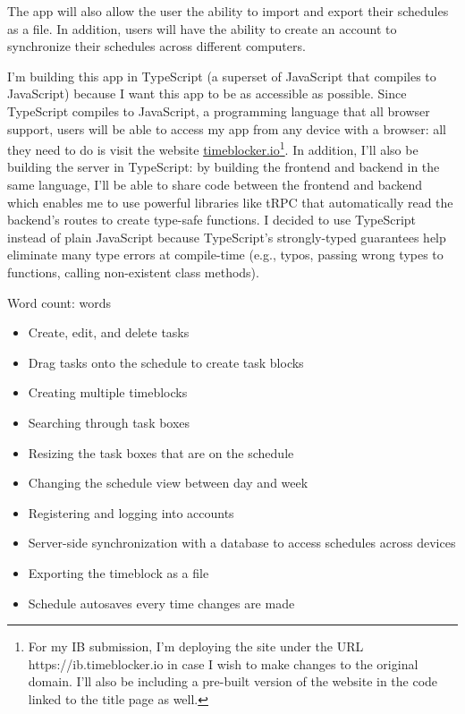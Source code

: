\documentclass[12pt, notitlepage]{article}
\newcommand\wordcount[2]{%
\py{word_count(#1, #2)}
\noindent Word count: words
}
\begin{document}
The app will also allow the user the ability to import and export their schedules as a file.
In addition, users will have the ability to create an account to synchronize their schedules across different computers.

I'm building this app in TypeScript (a superset of JavaScript that compiles to JavaScript) because I want this app to be as accessible as possible.
Since TypeScript compiles to JavaScript, a programming language that all browser support, users will be able to access my app from any device with a browser:
all they need to do is visit the website \href{https://ib.timeblocker.io}{timeblocker.io}\footnote{For my IB submission, I'm deploying the site under the URL https://ib.timeblocker.io in case I wish to make changes to the original domain. I'll also be including a pre-built version of the website in the code linked to the title page as well.}.
In addition, I'll also be building the server in TypeScript:
by building the frontend and backend in the same language, I'll be able to share code between the frontend and backend which enables me to use powerful libraries like tRPC that automatically read the backend's routes to create type-safe functions.
I decided to use TypeScript instead of plain JavaScript because TypeScript's strongly-typed guarantees help eliminate many type errors at compile-time (e.g., typos, passing wrong types to functions, calling non-existent class methods).

\bigskip
\wordcount

\section{Success Criteria}
\begin{itemize}
	\item Create, edit, and delete tasks
	\item Drag tasks onto the schedule to create task blocks
	\item Creating multiple timeblocks
	\item Searching through task boxes
	\item Resizing the task boxes that are on the schedule
	\item Changing the schedule view between day and week
	\item Registering and logging into accounts
	\item Server-side synchronization with a database to access schedules across devices
	\item Exporting the timeblock as a file
	\item Schedule autosaves every time changes are made
\end{itemize}
\end{document}
